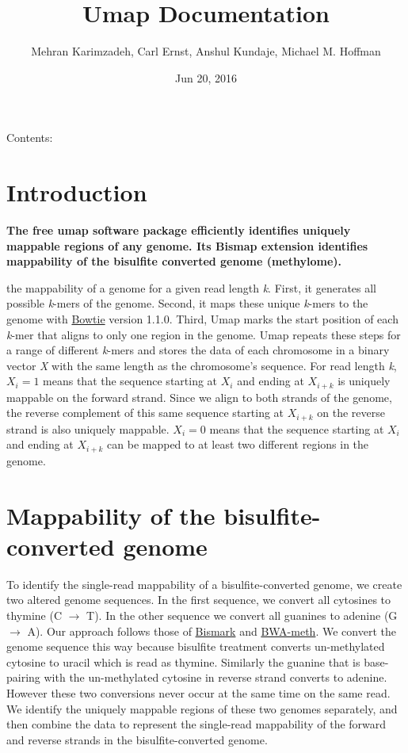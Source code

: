\documentclass[letterpaper,10pt,english]{sphinxmanual}
\title{Umap Documentation}
\date{Jun 20, 2016}
\author{Mehran Karimzadeh, Carl Ernst, Anshul Kundaje, Michael M. Hoffman}
\begin{document}
\maketitle
\tableofcontents
{}\label{documentation::doc}


Contents:


\chapter{Introduction}
\label{documentation:introduction}\label{documentation:welcome-to-umap-s-documentation}
\textbf{The free umap software package efficiently identifies uniquely mappable regions of any genome.
Its Bismap extension identifies mappability of the bisulfite converted genome (methylome).}

the mappability of a genome for a given read length \emph{k}.
First, it generates all possible \emph{k}-mers of the genome.
Second, it maps these unique \emph{k}-mers to the genome with \href{http://bowtie-bio.sourceforge.net/index.shtml}{Bowtie} version 1.1.0.
Third, Umap marks the start position of each \emph{k}-mer that aligns to only one region in the genome.
Umap repeats these steps for a range of different \emph{k}-mers and stores the data of each chromosome
in a binary vector \emph{X} with the same length as the chromosome's sequence.
For read length \emph{k}, \(X_i = 1\) means that the sequence starting at \(X_i\) and ending
at \(X_{i+k}\) is uniquely mappable on the forward strand.
Since we align to both strands of the genome, the reverse complement of this same sequence
starting at \(X_{i+k}\) on the reverse strand is also uniquely mappable.
\(X_i = 0\) means that the sequence starting at \(X_i\) and ending at
\(X_{i+k}\) can be mapped to at least two different regions in the genome.


\chapter{Mappability of the bisulfite-converted genome}
\label{documentation:mappability-of-the-bisulfite-converted-genome}
To identify the single-read mappability of a bisulfite-converted genome,
we create two altered genome sequences.
In the first sequence, we convert all cytosines to thymine (C \(\rightarrow\) T).
In the other sequence we convert all guanines to adenine (G \(\rightarrow\) A).
Our approach follows those of \href{http://www.bioinformatics.babraham.ac.uk/projects/bismark/}{Bismark}
and \href{https://github.com/brentp/bwa-meth}{BWA-meth}.
We convert the genome sequence this way because bisulfite
treatment converts un-methylated cytosine to uracil which is read as thymine.
Similarly the guanine that is base-pairing with the un-methylated cytosine in
reverse strand converts to adenine. However these two conversions never occur
at the same time on the same read. We identify the uniquely mappable regions
of these two genomes separately, and then combine the data to represent the
single-read mappability of the forward and reverse strands in the bisulfite-converted genome.
\end{document}
